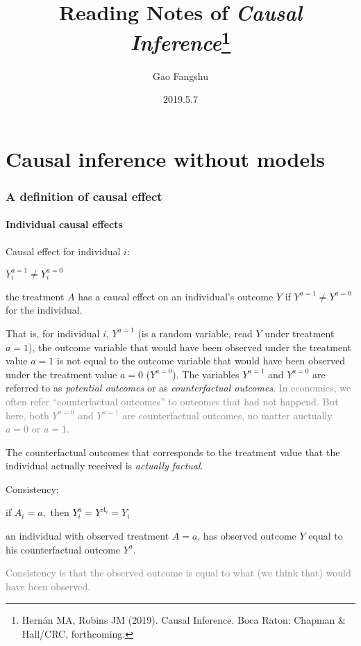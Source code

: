 \documentclass{article}
\title{Reading Notes of \textit{Causal Inference}\footnote{Hernán MA, Robins JM (2019). Causal Inference. Boca Raton: Chapman \& Hall/CRC, forthcoming.}}
\author{Gao Fangshu}
\date{2019.5.7}
\begin{document}
\maketitle
\part*{Causal inference without models}
\section{A definition of causal effect}
\subsection{Individual causal effects}
\begin{mdframed}
Causal effect for individual $i$: 
\begin{center}
	$Y_{i}^{a=1} \neq Y_{i}^{a=0}$
\end{center}
the treatment $A$ has a causal effect on an individual’s outcome $Y$ if $Y^{a=1} \neq Y^{a=0}$ for the individual.
\end{mdframed}

That is, for individual $i$,  $Y^{a=1}$ (is a random variable, read $Y$ under treatment $a=1$), the outcome variable that would have been observed under the treatment value $a=1$ is not equal to the outcome variable that would have been observed under the treatment value $a=0$ ($Y^{a=0}$). The variables  $Y^{a=1}$ and $Y^{a=0}$ are referred to as \textit{potential outcomes} or as \textit{counterfactual outcomes}. \textcolor{gray}{In economics, we often refer ``counterfactual outcomes'' to outcomes that had not happend. But here, both $Y^{a=0}$ and $Y^{a=1}$ are counterfactual outcomes, no matter auctually $a=0$ or $a=1$.}

The counterfactual outcomes that corresponds to the treatment value that the individual actually received is \textit{actually factual}.
\begin{mdframed}
Consistency:
\begin{center}
if $A_{i}=a,$ then $Y_{i}^{a}=Y^{A_{i}}=Y_{i}$
\end{center}
an individual with observed treatment $A=a$, has observed outcome $Y$ equal to his counterfactual outcome $Y^{a}$.
\end{mdframed}

\textcolor{gray}{Consistency is that the observed outcome is equal to what (we think that) would have been observed.}
\end{document}
